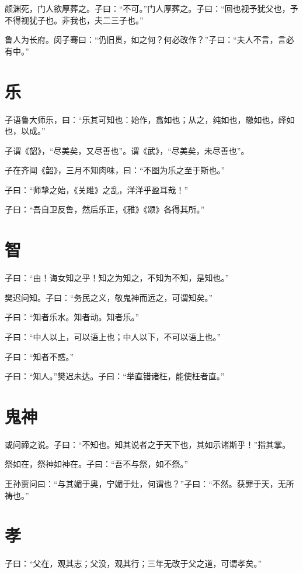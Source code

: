 \documentclass[a5paper]{ctexbook}
\begin{document}
    颜渊死，门人欲厚葬之。子曰：“不可。”门人厚葬之。子曰：“回也视予犹父也，予不得视犹子也。非我也，夫二三子也。”

    鲁人为长府。闵子骞曰：“仍旧贯，如之何？何必改作？”子曰：“夫人不言，言必有中。”

    \chapter{乐}

    子语鲁大师乐，曰：“乐其可知也：始作，翕如也；从之，纯如也，皦如也，绎如也，以成。”

    子谓《韶》，“尽美矣，又尽善也”。谓《武》，“尽美矣，未尽善也”。

    子在齐闻《韶》，三月不知肉味，曰：“不图为乐之至于斯也。”

    子曰：“师挚之始，《关雎》之乱，洋洋乎盈耳哉！”

    子曰：“吾自卫反鲁，然后乐正，《雅》《颂》各得其所。”

    \chapter{智}

    子曰：“由！诲女知之乎！知之为知之，不知为不知，是知也。”

    樊迟问知。子曰：“务民之义，敬鬼神而远之，可谓知矣。”
    
    子曰：“知者乐水。知者动。知者乐。”

    子曰：“中人以上，可以语上也；中人以下，不可以语上也。”

    子曰：“知者不惑。”

    子曰：“知人。”樊迟未达。子曰：“举直错诸枉，能使枉者直。”

    \chapter{鬼神}

    或问禘之说。子曰：“不知也。知其说者之于天下也，其如示诸斯乎！”指其掌。

    祭如在，祭神如神在。子曰：“吾不与祭，如不祭。”

    王孙贾问曰：“与其媚于奥，宁媚于灶，何谓也？”子曰：“不然。获罪于天，无所祷也。”

    \chapter{孝}

    子曰：“父在，观其志；父没，观其行；三年无改于父之道，可谓孝矣。”
\end{document}
